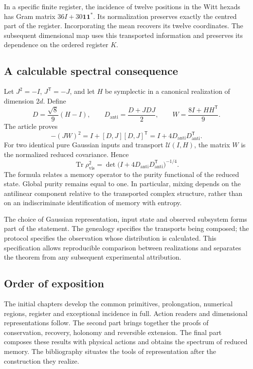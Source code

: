 In a specific finite register, the incidence of twelve positions in the Witt hexads has Gram matrix
\(36I+30\mathbf1\mathbf1^*\). Its normalization preserves exactly the centred part of the register. Incorporating the mean recovers its twelve coordinates. The subsequent dimensional map uses this transported information and preserves its dependence on the ordered register \(K\).

\subsection{A calculable spectral consequence}
Let \(J^2=-I\), \(J^{\mathsf T}=-J\), and let \(H\) be symplectic in a canonical realization of dimension \(2d\). Define
\[
D=\frac{\sqrt8}{9}(H-I),\qquad
D_{\mathrm{anti}}=\frac{D+JDJ}{2},\qquad
W=\frac{8I+HH^{\mathsf T}}9.
\]
The article proves
\begin{equation}
\boxed{-(JW)^2=I+[D,J][D,J]^{\mathsf T}
=I+4D_{\mathrm{anti}}D_{\mathrm{anti}}^{\mathsf T}.}
\label{nuclear:eq:espectro}
\end{equation}
For two identical pure Gaussian inputs and transport \(\mathcal U(I,H)\), the matrix \(W\) is the normalized reduced covariance. Hence
\[
\operatorname{Tr}\rho_{\mathrm{vis}}^2
=\det\bigl(I+4D_{\mathrm{anti}}D_{\mathrm{anti}}^{\mathsf T}\bigr)^{-1/4}.
\]
The formula relates a memory operator to the purity functional of the reduced state. Global purity remains equal to one. In particular, mixing depends on the antilinear component relative to the transported complex structure, rather than on an indiscriminate identification of memory with entropy.

The choice of Gaussian representation, input state and observed subsystem forms part of the statement. The genealogy specifies the transports being composed; the protocol specifies the observation whose distribution is calculated. This specification allows reproducible comparison between realizations and separates the theorem from any subsequent experimental attribution.

\subsection{Order of exposition}
The initial chapters develop the common primitives, prolongation, numerical regions, register and exceptional incidence in full. Action readers and dimensional representations follow. The second part brings together the proofs of conservation, recovery, holonomy and reversible extension. The final part composes these results with physical actions and obtains the spectrum of reduced memory. The bibliography situates the tools of representation after the construction they realize.

